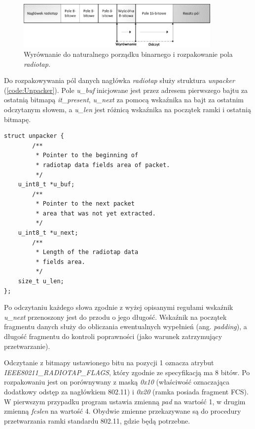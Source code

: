 \begin{figure}[htb]
\begin{center}
\includegraphics[width=378px]{img/RadiotapUnpack}
\caption{Wyrównanie do naturalnego porządku binarnego i rozpakowanie pola \emph{radiotap}.}
\label{RadiotapUnpack}
\end{center}
\end{figure}

Do rozpakowywania pól danych nagłówka \emph{radiotap} służy struktura \emph{unpacker} (\ref{code:Unpacker}). Pole \emph{u\_buf} inicjowane jest przez adresem pierwszego bajtu za ostatnią bitmapą \emph{it\_present}, \emph{u\_next} za pomocą  wskaźnika na bajt za ostatnim odczytanym słowem, a \emph{u\_len} jest różnicą wskaźnika na początek ramki i ostatnią bitmapę. 

\begin{lstlisting}[frame=tb]
struct unpacker {
        /** 
         * Pointer to the beginning of 
         * radiotap data fields area of packet. 
         */
	u_int8_t *u_buf;
        /** 
         * Pointer to the next packet 
         * area that was not yet extracted. 
         */
	u_int8_t *u_next;
        /** 
         * Length of the radiotap data 
         * fields area. 
         */
	size_t u_len;
};
\end{lstlisting}

Po odczytaniu każdego słowa zgodnie z wyżej opisanymi regułami wskaźnik \emph{u\_next} przenoszony jest do przodu o jego długość. Wskaźnik na początek fragmentu danych służy do obliczania ewentualnych wypełnień (ang. \emph{padding}), a długość fragmentu do kontroli poprawności (jako warunek zatrzymujący przetwarzanie).

Odczytanie z bitmapy ustawionego bitu na pozycji 1 oznacza atrybut \emph{IEEE80211\_RADIOTAP\_FLAGS}, który zgodnie ze specyfikacją ma 8 bitów. Po rozpakowaniu jest on porównywany z maską \emph{0x10} (właściwość oznaczająca dodatkowy odstęp za nagłówkiem 802.11) i \emph{0x20} (ramka posiada fragment FCS). W pierwszym przypadku program ustawia zmienną \emph{pad} na wartość 1, w drugim zmienną \emph{fcslen} na wartość 4. Obydwie zmienne przekazywane są do procedury przetwarzania ramki standardu 802.11, gdzie będą potrzebne. 

